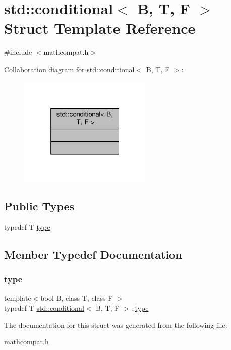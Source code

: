 \hypertarget{structstd_1_1conditional}{}\section{std\+:\+:conditional$<$ B, T, F $>$ Struct Template Reference}
\label{structstd_1_1conditional}


{\ttfamily \#include $<$mathcompat.\+h$>$}



Collaboration diagram for std\+:\+:conditional$<$ B, T, F $>$\+:\nopagebreak
\begin{figure}[H]
\begin{center}
\leavevmode
\includegraphics[width=181pt]{d6/d54/structstd_1_1conditional__coll__graph}
\end{center}
\end{figure}
\subsection*{Public Types}
\begin{DoxyCompactItemize}
\item 
typedef T \hyperlink{structstd_1_1conditional_afa082101adbc68eaea9c49e34fa8ebfa}{type}
\end{DoxyCompactItemize}


\subsection{Member Typedef Documentation}
\mbox{\label{structstd_1_1conditional_afa082101adbc68eaea9c49e34fa8ebfa}} 
\subsubsection{\texorpdfstring{type}{type}}
{\footnotesize\ttfamily template$<$bool B, class T, class F $>$ \\
typedef T \hyperlink{structstd_1_1conditional}{std\+::conditional}$<$ B, T, F $>$\+::\hyperlink{structstd_1_1conditional_afa082101adbc68eaea9c49e34fa8ebfa}{type}}



The documentation for this struct was generated from the following file\+:\begin{DoxyCompactItemize}
\item 
\hyperlink{mathcompat_8h}{mathcompat.\+h}\end{DoxyCompactItemize}
